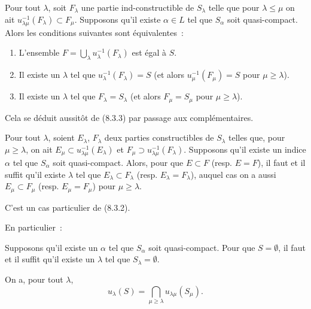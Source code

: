 \begin{corollary}[8.3.4]
\label{IV.8.3.4-fr}
Pour tout $\lambda$, soit $F_\lambda$ une partie ind-constructible de
$S_\lambda$ telle que pour $\lambda\leq\mu$ on ait
$u_{\lambda\mu}^{-1}(F_\lambda)\subset F_\mu$. Supposons qu'il existe
$\alpha\in L$ tel que $S_\alpha$ soit quasi-compact. Alors les conditions
suivantes sont équivalentes~:
\begin{enumerate}
\item[\emph{a)}] L'ensemble
$F=\bigcup_\lambda u_\lambda^{-1}(F_\lambda)$ est égal à $S$.
\item[\emph{b)}] Il existe un $\lambda$ tel que
$u_\lambda^{-1}(F_\lambda)=S$ \textup{(et alors
$u_\mu^{-1}(F_\mu)=S$ pour $\mu\geq\lambda$)}.
\item[\emph{c)}] Il existe un $\lambda$ tel que $F_\lambda=S_\lambda$ \textup{(et
alors $F_\mu=S_\mu$ pour $\mu\geq\lambda$)}.
\end{enumerate}
\end{corollary}

Cela se déduit aussitôt de (8.3.3) par passage aux complémentaires.

\begin{corollary}[8.3.5]
\label{IV.8.3.5-fr}
Pour tout $\lambda$, soient $E_\lambda$, $F_\lambda$ deux parties
constructibles de $S_\lambda$ telles que, pour $\mu\geq\lambda$, on ait
$E_\mu\subset u_{\lambda\mu}^{-1}(E_\lambda)$ et
$F_\mu\supset u_{\lambda\mu}^{-1}(F_\lambda)$. Supposons qu'il existe un
indice $\alpha$ tel que $S_\alpha$ soit quasi-compact. Alors, pour que
$E\subset F$ \textup{(resp. $E=F$)}, il faut et il suffit qu'il existe $\lambda$ tel
que $E_\lambda\subset F_\lambda$ \textup{(resp. $E_\lambda=F_\lambda$)}, auquel cas
on a aussi $E_\mu\subset F_\mu$ \textup{(resp. $E_\mu=F_\mu$)} pour
$\mu\geq\lambda$.
\end{corollary}

C'est un cas particulier de (8.3.2).

En particulier~:

\begin{corollary}[8.3.6]
\label{IV.8.3.6-fr}
Supposons qu'il existe un $\alpha$ tel que $S_\alpha$ soit quasi-compact.
Pour que $S=\emptyset$, il faut et il suffit qu'il existe un $\lambda$ tel
que $S_\lambda=\emptyset$.
\end{corollary}

\begin{corollary}[8.3.7]
\label{IV.8.3.7-fr}
On a, pour tout $\lambda$,
\begin{equation}
u_\lambda(S)=\bigcap_{\mu\geq\lambda}u_{\lambda\mu}(S_\mu).
\tag{8.3.7.1}\label{IV.8.3.7.1-fr}
\end{equation}
\end{corollary}

